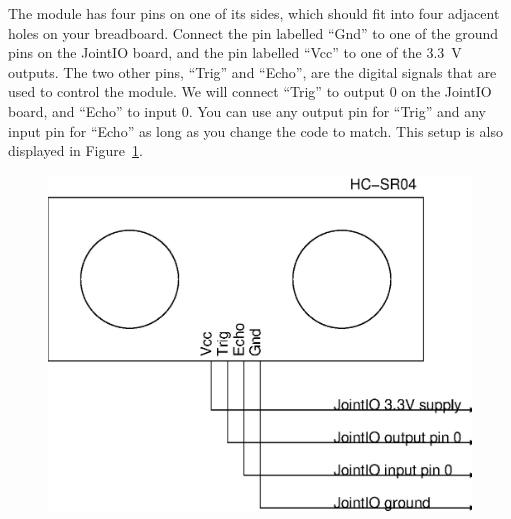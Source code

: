 \documentclass{article}
\begin{document}
The module has four pins on one of its sides, which should fit into four
adjacent holes on your breadboard. Connect the pin labelled ``Gnd'' to one of
the ground pins on the JointIO board, and the pin labelled ``Vcc'' to one of the
\SI{3.3}{\volt} outputs. The two other pins, ``Trig'' and ``Echo'', are the
digital signals that are used to control the module. We will connect ``Trig''
to output 0 on the JointIO board, and ``Echo'' to input 0. You can use any
output pin for ``Trig'' and any input pin for ``Echo'' as long as you change the
code to match. This setup is also displayed in
Figure~\ref{fig:schem:ultra-jointio}.

\begin{figure}[h]
\centering
\includegraphics[scale=.7]{assets/fig/schem/ultra-jointio}
\label{fig:schem:ultra-jointio}
\end{figure}



\end{document}
